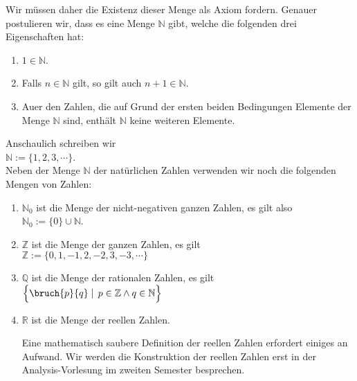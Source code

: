 Wir m\"{u}ssen daher die Existenz dieser Menge als Axiom fordern.  Genauer postulieren wir, dass es eine
Menge $\mathbb{N}$ gibt, welche die folgenden drei Eigenschaften hat:
\begin{enumerate}
\item $1 \in \mathbb{N}$.
\item Falls $n \in \mathbb{N}$ gilt, so gilt auch $n+1 \in \mathbb{N}$.
\item Au\3er den Zahlen, die auf Grund der ersten beiden Bedingungen Elemente der Menge $\mathbb{N}$ sind, enth\"{a}lt
      $\mathbb{N}$ keine weiteren Elemente.
\end{enumerate}
Anschaulich schreiben wir \\[0.2cm]
\hspace*{1.3cm} $\mathbb{N} := \{ 1, 2, 3, \cdots \}$. \\[0.2cm]
Neben der Menge $\mathbb{N}$ der nat\"{u}rlichen Zahlen verwenden wir noch die folgenden
Mengen von Zahlen: 
\begin{enumerate}
\item $\mathbb{N}_0$ ist die Menge der nicht-negativen ganzen Zahlen, es gilt also
      \\[0.2cm]
      \hspace*{1.3cm}
      $\mathbb{N}_0 := \{ 0 \} \cup \mathbb{N}$.
\item $\mathbb{Z}$ ist die Menge der ganzen Zahlen, es gilt
      \\[0.2cm]
      \hspace*{1.3cm}
      $\mathbb{Z} := \{ 0, 1, -1, 2, -2, 3, -3, \cdots \}$ 

\item $\mathbb{Q}$ ist die Menge der rationalen Zahlen, es gilt
      \\[0.2cm]
      \hspace*{1.3cm}
      $\Bigl\{ \bruch{p}{q} \mid\, p \in \mathbb{Z} \wedge q \in \mathbb{N} \Bigr\}$
\item $\mathbb{R}$ ist die Menge der reellen Zahlen.

      Eine mathematisch saubere Definition der reellen Zahlen erfordert einiges an Aufwand.  Wir
      werden die Konstruktion der reellen Zahlen erst in der Analysis-Vorlesung im zweiten Semester
      besprechen. 
\end{enumerate}


